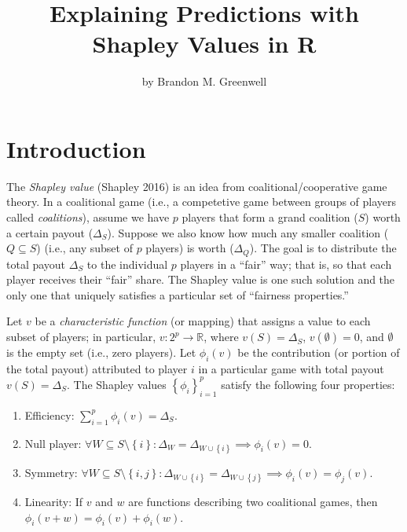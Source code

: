 \title{Explaining Predictions with Shapley Values in R}
\author{by Brandon M. Greenwell}

\maketitle


\hypertarget{introduction}{%
\section{Introduction}\label{introduction}}

The \emph{Shapley value} (Shapley 2016) is an idea from coalitional/cooperative game theory. In a coalitional game (i.e., a competetive game between groups of players called \emph{coalitions}), assume we have \(p\) players that form a grand coalition (\(S\)) worth a certain payout (\(\Delta_S\)). Suppose we also know how much any smaller coalition (\(Q \subseteq S\)) (i.e., any subset of \(p\) players) is worth (\(\Delta_Q\)). The goal is to distribute the total payout \(\Delta_S\) to the individual \(p\) players in a ``fair'' way; that is, so that each player receives their ``fair'' share. The Shapley value is one such solution and the only one that uniquely satisfies a particular set of ``fairness properties.''

Let \(v\) be a \emph{characteristic function} (or mapping) that assigns a value to each subset of players; in particular, \(v : 2^p \rightarrow \mathbb{R}\), where \(v\left(S\right) = \Delta_S\), \(v\left(\emptyset\right) = 0\), and \(\emptyset\) is the empty set (i.e., zero players). Let \(\phi_i\left(v\right)\) be the contribution (or portion of the total payout) attributed to player \(i\) in a particular game with total payout \(v\left(S\right) = \Delta_S\). The Shapley values \(\left\{\phi_i\right\}_{i=1}^p\) satisfy the following four properties:

\begin{enumerate}
\def\labelenumi{\arabic{enumi}.}
\item
  Efficiency: \(\sum_{i = 1} ^ p \phi_i\left(v\right) = \Delta_S\).
\item
  Null player: \(\forall W \subseteq S \setminus \left\{i\right\}: \Delta_W = \Delta_{W \cup \left\{i\right\}} \implies \phi_i\left(v\right) = 0\).
\item
  Symmetry: \(\forall W \subseteq S \setminus \left\{i, j\right\}: \Delta_{W \cup \left\{i\right\}} = \Delta_{W \cup \left\{j\right\}} \implies \phi_i\left(v\right) = \phi_j\left(v\right)\).
\item
  Linearity: If \(v\) and \(w\) are functions describing two coalitional games, then \(\phi_i\left(v + w\right) = \phi_i\left(v\right) + \phi_i\left(w\right)\).
\end{enumerate}

